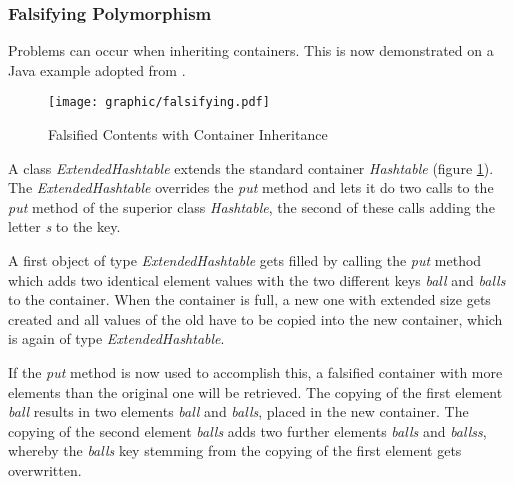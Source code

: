 %
%
%
%
%
%
%

\subsubsection{Falsifying Polymorphism}
\label{falsifying_polymorphism_heading}

Problems can occur when inheriting containers. This is now demonstrated on a Java
example adopted from \cite{javaiaq}.

\begin{figure}[ht]
    \begin{center}
        \texttt{[image: graphic/falsifying.pdf]}
        \caption{Falsified Contents with Container Inheritance}
        \label{falsifying_figure}
    \end{center}
\end{figure}

A class \emph{ExtendedHashtable} extends the standard container \emph{Hashtable}
(figure \ref{falsifying_figure}). The \emph{ExtendedHashtable} overrides the
\emph{put} method and lets it do two calls to the \emph{put} method of the
superior class \emph{Hashtable}, the second of these calls adding the letter
\emph{s} to the key.

A first object of type \emph{ExtendedHashtable} gets filled by calling the
\emph{put} method which adds two identical element values with the two different
keys \emph{ball} and \emph{balls} to the container. When the container is full,
a new one with extended size gets created and all values of the old have to be
copied into the new container, which is again of type \emph{ExtendedHashtable}.

If the \emph{put} method is now used to accomplish this, a falsified container
with more elements than the original one will be retrieved. The copying of the
first element \emph{ball} results in two elements \emph{ball} and \emph{balls},
placed in the new container. The copying of the second element \emph{balls} adds
two further elements \emph{balls} and \emph{ballss}, whereby the \emph{balls}
key stemming from the copying of the first element gets overwritten.

